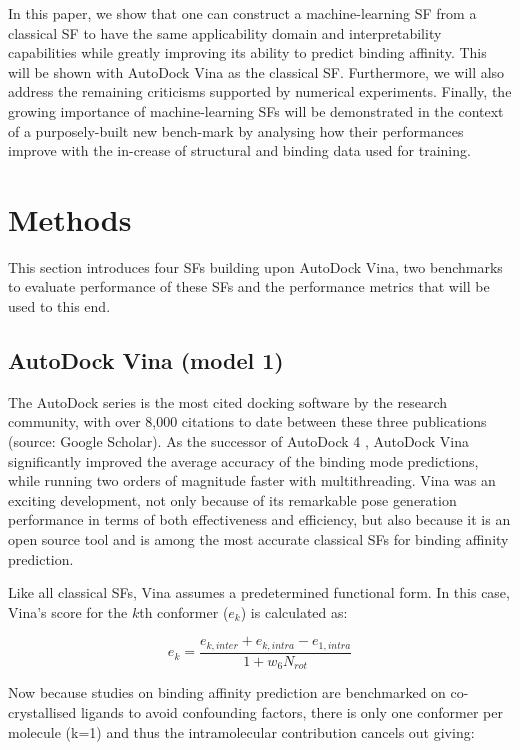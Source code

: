 In this paper, we show that one can construct a machine-learning SF from a classical SF to have the same applicability domain and interpretability capabilities while greatly improving its ability to predict binding affinity. This will be shown with AutoDock Vina \citep{595} as the classical SF. Furthermore, we will also address the remaining criticisms supported by numerical experiments. Finally, the growing importance of machine-learning SFs will be demonstrated in the context of a purposely-built new bench-mark by analysing how their performances improve with the in-crease of structural and binding data used for training.

\section{Methods}

This section introduces four SFs building upon AutoDock Vina, two benchmarks to evaluate performance of these SFs and the performance metrics that will be used to this end.

\subsection{AutoDock Vina (model 1)}

The AutoDock series \citep{597,596,595} is the most cited docking software by the research community, with over 8,000 citations to date between these three publications (source: Google Scholar). As the successor of AutoDock 4 \citep{596}, AutoDock Vina \citep{595} significantly improved the average accuracy of the binding mode predictions, while running two orders of magnitude faster with multithreading. Vina was an exciting development, not only because of its remarkable pose generation performance in terms of both effectiveness and efficiency, but also because it is an open source tool and is among the most accurate classical SFs for binding affinity prediction.

Like all classical SFs, Vina assumes a predetermined functional form. In this case, Vina's score for the $k$th conformer ($e_k$) is calculated as:

\begin{equation}
\label{rfscore3:e_k}
e_k=\frac{e_{k,inter}+e_{k,intra}-e_{1,intra}}{1+w_6N_{rot}}
\end{equation}

Now because studies on binding affinity prediction are benchmarked on co-crystallised ligands to avoid confounding factors, there is only one conformer per molecule (k=1) and thus the intramolecular contribution cancels out giving:

